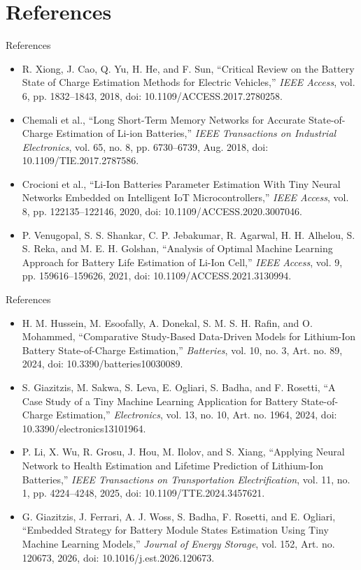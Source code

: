 \documentclass[10pt,aspectratio=43]{beamer}
\begin{document}
\section{References}
\begin{frame}[t]{References}
  \footnotesize
  \begin{itemize}
    \setlength{\itemsep}{4pt}
    \item[{[1]}] R. Xiong, J. Cao, Q. Yu, H. He, and F. Sun, ``Critical Review on the Battery State of Charge Estimation Methods for Electric Vehicles,'' \textit{IEEE Access}, vol. 6, pp. 1832--1843, 2018, doi: 10.1109/ACCESS.2017.2780258.
    \item[{[2]}] Chemali et al., ``Long Short-Term Memory Networks for Accurate State-of-Charge Estimation of Li-ion Batteries,'' \textit{IEEE Transactions on Industrial Electronics}, vol. 65, no. 8, pp. 6730--6739, Aug. 2018, doi: 10.1109/TIE.2017.2787586.
    \item[{[3]}] Crocioni et al., ``Li-Ion Batteries Parameter Estimation With Tiny Neural Networks Embedded on Intelligent IoT Microcontrollers,'' \textit{IEEE Access}, vol. 8, pp. 122135--122146, 2020, doi: 10.1109/ACCESS.2020.3007046.
    \item[{[4]}] P. Venugopal, S. S. Shankar, C. P. Jebakumar, R. Agarwal, H. H. Alhelou, S. S. Reka, and M. E. H. Golshan, ``Analysis of Optimal Machine Learning Approach for Battery Life Estimation of Li-Ion Cell,'' \textit{IEEE Access}, vol. 9, pp. 159616--159626, 2021, doi: 10.1109/ACCESS.2021.3130994.
  \end{itemize}
\end{frame}

\begin{frame}[t]{References}
  \footnotesize
  \begin{itemize}
    \setlength{\itemsep}{4pt}
    \item[{[5]}] H. M. Hussein, M. Esoofally, A. Donekal, S. M. S. H. Rafin, and O. Mohammed, ``Comparative Study-Based Data-Driven Models for Lithium-Ion Battery State-of-Charge Estimation,'' \textit{Batteries}, vol. 10, no. 3, Art. no. 89, 2024, doi: 10.3390/batteries10030089.
    \item[{[6]}] S. Giazitzis, M. Sakwa, S. Leva, E. Ogliari, S. Badha, and F. Rosetti, ``A Case Study of a Tiny Machine Learning Application for Battery State-of-Charge Estimation,'' \textit{Electronics}, vol. 13, no. 10, Art. no. 1964, 2024, doi: 10.3390/electronics13101964.
    \item[{[7]}] P. Li, X. Wu, R. Grosu, J. Hou, M. Ilolov, and S. Xiang, ``Applying Neural Network to Health Estimation and Lifetime Prediction of Lithium-Ion Batteries,'' \textit{IEEE Transactions on Transportation Electrification}, vol. 11, no. 1, pp. 4224--4248, 2025, doi: 10.1109/TTE.2024.3457621.
    \item[{[8]}] G. Giazitzis, J. Ferrari, A. J. Woss, S. Badha, F. Rosetti, and E. Ogliari, ``Embedded Strategy for Battery Module States Estimation Using Tiny Machine Learning Models,'' \textit{Journal of Energy Storage}, vol. 152, Art. no. 120673, 2026, doi: 10.1016/j.est.2026.120673.
  \end{itemize}
\end{frame}
\end{document}
